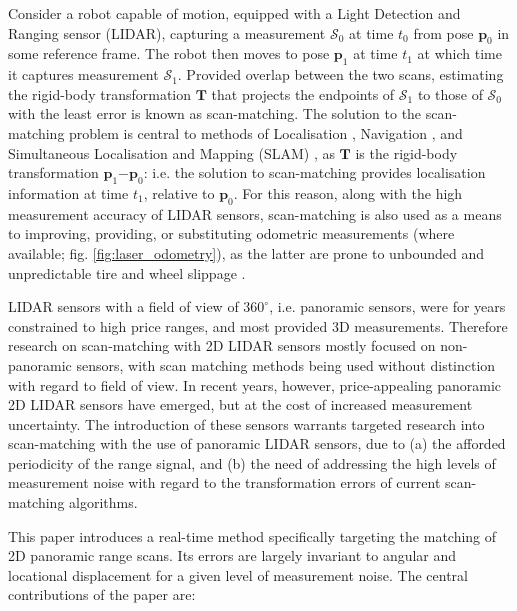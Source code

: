 Consider a robot capable of motion, equipped with a Light Detection and Ranging
sensor (LIDAR), capturing a measurement $\mathcal{S}_0$ at time $t_0$ from pose
$\bm{p}_0$ in some reference frame. The robot then moves to pose $\bm{p}_1$ at
time $t_1$ at which time it captures measurement $\mathcal{S}_1$. Provided
overlap between the two scans, estimating the rigid-body transformation
$\bm{T}$ that projects the endpoints of $\mathcal{S}_1$ to those of
$\mathcal{S}_0$ with the least error is known as scan-matching. The solution to
the scan-matching problem is central to methods of Localisation
\cite{Ju2019}, Navigation
\cite{Kumar2018}, and Simultaneous
Localisation and Mapping (SLAM) \cite{Zhang2019,Pedrosa2020}, as
$\bm{T}$ is the rigid-body transformation $\bm{p}_1$$-$$\bm{p}_0$: i.e. the
solution to scan-matching provides localisation information at time $t_1$,
relative to $\bm{p}_0$. For this reason, along with the high measurement
accuracy of LIDAR sensors, scan-matching is also used as a means to improving,
providing, or substituting odometric measurements (where available; fig.
\ref{fig:laser_odometry}), as the latter are prone to unbounded and
unpredictable tire and wheel slippage \cite{Olson2009,Zhang2020}.

LIDAR sensors with a field of view of $360^\circ$, i.e. panoramic sensors, were
for years constrained to high price ranges, and most provided 3D measurements.
Therefore research on scan-matching with 2D LIDAR sensors mostly focused on
non-panoramic sensors, with scan matching methods being used without distinction
with regard to field of view. In recent years, however, price-appealing
panoramic 2D LIDAR sensors have emerged, but at the cost of increased measurement
uncertainty. The introduction of these sensors warrants targeted research
into scan-matching with the use of panoramic LIDAR sensors, due to (a) the
afforded periodicity of the range signal, and (b) the need of
addressing the high levels of measurement noise with regard to the
transformation errors of current scan-matching algorithms.

This paper introduces a real-time method specifically targeting the matching of
2D panoramic range scans. Its errors are largely invariant to angular and
locational displacement for a given level of measurement noise. The central
contributions of the paper are:

